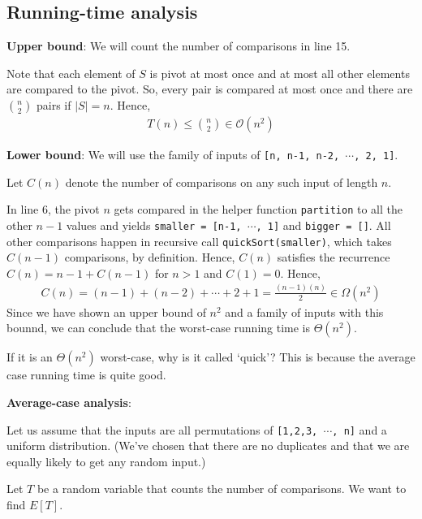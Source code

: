 \documentclass[11pt]{article}
\begin{document}
\subsection{Running-time analysis}
\textbf{Upper bound}: We will count the number of comparisons in line 15. 

Note that each element of $S$ is pivot at most once and at most all other elements are compared to the pivot. So, every pair is compared at most once and there are $\binom{n}{2}$ pairs if $|S| = n$. Hence, 
\begin{align*}
    T(n) \leq \binom{n}{2} \in \mathcal{O}(n^2)
\end{align*}

\textbf{Lower bound}: We will use the family of inputs of \texttt{[n, n-1, n-2, $\cdots$, 2, 1]}. 

Let $C(n)$ denote the number of comparisons on any such input of length $n$.

In line 6, the pivot $n$ gets compared in the helper function \texttt{partition} to all the other $n-1$ values and yields \texttt{smaller = [n-1, $\cdots$, 1]} and \texttt{bigger = []}. All other comparisons happen in recursive call \texttt{quickSort(smaller)}, which takes $C(n-1)$ comparisons, by definition. Hence, $C(n)$ satisfies the recurrence $C(n) = n-1 + C(n-1)$ for $n > 1$ and $C(1) = 0$. Hence, 
\begin{align*}
    C(n) = (n-1) + (n-2) + \cdots + 2 + 1 = \frac{(n-1)(n)}{2} \in \Omega(n^2)
\end{align*}
Since we have shown an upper bound of $n^2$ and a family of inputs with this bounnd, we can conclude that the worst-case running time is $\Theta(n^2)$. 

If it is an $\Theta(n^2)$ worst-case, why is it called `quick'? This is because the average case running time is quite good. 

\textbf{Average-case analysis}:

Let us assume that the inputs are all permutations of \texttt{[1,2,3, $\cdots$, n]} and a uniform distribution. (We've chosen that there are no duplicates and that we are equally likely to get any random input.)

Let $T$ be a random variable that counts the number of comparisons. We want to find $E[T]$. 
\end{document}
